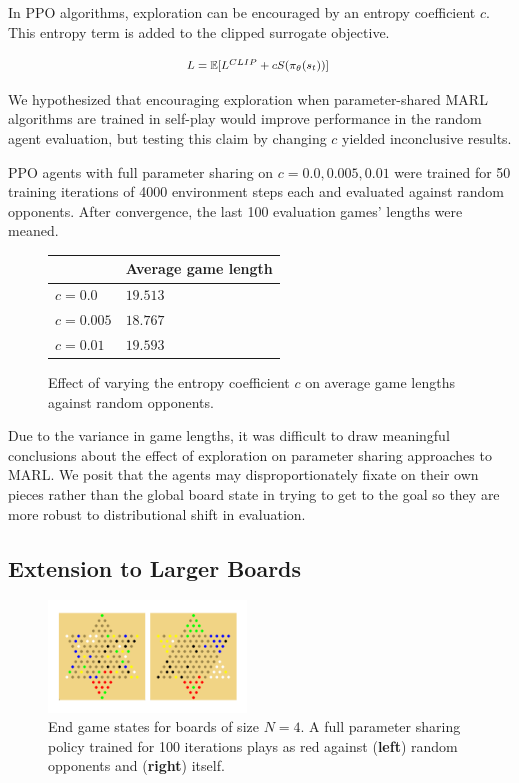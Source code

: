 \documentclass[12pt, a4paper, twocolumn]{article}
\begin{document}
In PPO algorithms, exploration can be encouraged by an entropy coefficient $c$. This entropy term is added to the clipped surrogate objective.

$$
  \mbox{\footnotesize
  $L = \mathbb{E}[L^{CLIP} + cS(\pi_{\theta}(s_t))]$
  }
$$

We hypothesized that encouraging exploration when parameter-shared MARL algorithms are trained in self-play would improve performance in the random agent evaluation, but testing this claim by changing $c$ yielded inconclusive results.

PPO agents with full parameter sharing on $c = 0.0, 0.005, 0.01$ were trained for 50 training iterations of 4000 environment steps each and evaluated against random opponents. After convergence, the last 100 evaluation games' lengths were meaned.

\begin{figure}[h]
\centering
  \begin{tabular}{|m{}|m{}|}
    \hline
     & Average game length \\
    \hline
    $c = 0.0$ & $19.513$   \\
    $c = 0.005$ & $18.767$ \\
    $c = 0.01$ & $19.593$ \\
    \hline
  \end{tabular}
  \caption{Effect of varying the entropy coefficient $c$ on average game lengths against random opponents.}\label{fig:exploration}
\end{figure}

Due to the variance in game lengths, it was difficult to draw meaningful conclusions about the effect of exploration on parameter sharing approaches to MARL. We posit that the agents may disproportionately fixate on their own pieces rather than the global board state in trying to get to the goal so they are more robust to distributional shift in evaluation.

\subsection{Extension to Larger Boards}

\begin{figure}[h]
  \centering
    \includegraphics[width=0.47\textwidth]{images/larger_boards.png}
  \caption{End game states for boards of size $N = 4$. A full parameter sharing policy trained for 100 iterations plays as red against (\textbf{left}) random opponents and (\textbf{right}) itself.}\label{fig:largerboards}
\end{figure}
\end{document}
